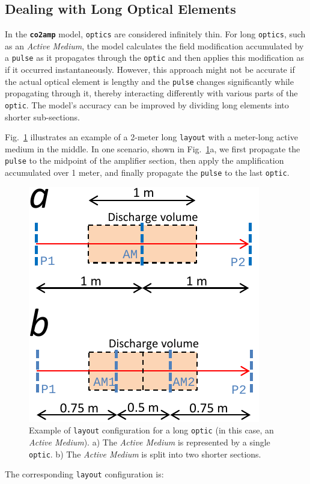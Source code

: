 \subsection{Dealing with Long Optical Elements}
In the \textbf{\texttt{co2amp}} model, \texttt{optics} are considered infinitely thin. For long \texttt{optics}, such as an \textit{Active Medium}, the model calculates the field modification accumulated by a \texttt{pulse} as it propagates through the \texttt{optic} and then applies this modification as if it occurred instantaneously. However, this approach might not be accurate if the actual optical element is lengthy and the \texttt{pulse} changes significantly while propagating through it, thereby interacting differently with various parts of the \texttt{optic}. The model's accuracy can be improved by dividing long elements into shorter sub-sections.

Fig.~\ref{fig:layout} illustrates an example of a 2-meter long \texttt{layout} with a meter-long active medium in the middle. In one scenario, shown in Fig.~\ref{fig:layout}a, we first propagate the \texttt{pulse} to the midpoint of the amplifier section, then apply the amplification accumulated over 1 meter, and finally propagate the \texttt{pulse} to the last \texttt{optic}.
\begin{figure}[ht]
\centering
\includegraphics{images/layout}
\caption{Example of \texttt{layout} configuration for a long \texttt{optic} (in this case, an \textit{Active Medium}). a) The \textit{Active Medium} is represented by a single \texttt{optic}. b) The \textit{Active Medium} is split into two shorter sections.}\label{fig:layout}
\end{figure}
The corresponding \texttt{layout} configuration is:

